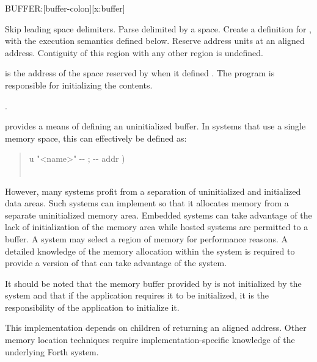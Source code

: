 \begin{worddef*}{}{BUFFER:}[buffer-colon][x:buffer]
\item {}

	Skip leading space delimiters. Parse  delimited by a space.
	Create a definition for , with the execution semantics defined
	below.  Reserve  address units at an aligned address.
	Contiguity of this region with any other region is undefined.

\execute[name]

	 is the address of the space reserved by  when
	it defined .  The program is responsible for initializing the
	contents.

\see {}.

	\begin{rationale}
		 provides a means of defining an uninitialized buffer.
		In systems that use a single memory space, this can effectively
		be defined as:

		\begin{quote}\ttfamily
			\word{:}   u "<name>" -{}- ; -{}- addr ) \\
			\tab\,  \\
			\word{;}
		\end{quote} 

		However, many systems profit from a separation of uninitialized and
		initialized data areas.  Such systems can implement  so
		that it allocates memory from a separate uninitialized memory area.
		Embedded systems can take advantage of the lack of initialization of the
		memory area while hosted systems are permitted to 
		a buffer.
		A system may select a region of memory for performance reasons.
		A detailed knowledge of the memory allocation within the system
		is required to provide a version of  that can take
		advantage of the system.

		It should be noted that the memory buffer provided by 
		is not initialized by the system and that if the application requires
		it to be initialized, it is the responsibility of the application to
		initialize it.
	\end{rationale}

	\begin{implement}
		\dffamily
		This implementation depends on children of  returning an
		aligned address.  Other memory location techniques require
		implementation-specific knowledge of the underlying Forth system.


\end{implement}
\end{worddef*}
